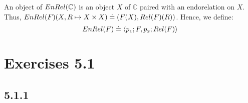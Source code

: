 \documentclass{article}
\begin{document}
\begin{center}
\end{center}

An object of $\mit{EnRel}(\mathbb C)$ is an object $X$ of $\mathbb C$ paired with an endorelation on
$X$. Thus, $\mit{EnRel}(F)(X, R \mapsto X \times X) \doteq (F(X), \mit{Rel}(F)(R))$. Hence, we define:
$$ \mit{EnRel}(F) \doteq \langle p_1;F, p_2;\mit{Rel}(F) \rangle$$ 

\section*{Exercises 5.1}

\subsection*{5.1.1}
\end{document}
